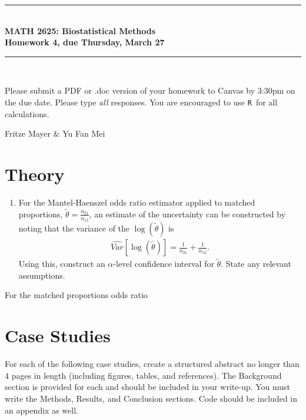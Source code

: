 \documentclass{article}
\newcommand{\HRule}{\rule{\linewidth}{0.5mm}}
\newcommand{\R}{\texttt{R}}
\begin{document}
	\begin{center}
		\HRule \\[0.1cm]
		\vspace{0.1cm}
		{ \LARGE \bfseries MATH 2625: Biostatistical Methods\\[0.5cm] Homework 4, due Thursday, March 27 } \\[0.1cm]
		\HRule \\[0.1cm]
	\end{center}
	
		Please submit a PDF or .doc version of your homework to Canvas by 3:30pm on the due date. Please type \emph{all} responses. You are encouraged to use \R\ for all calculations.

		Fritze Mayer \& Yu Fan Mei
		
	\section*{Theory}
	\begin{enumerate}
		\item For the Mantel-Haenszel odds ratio estimator applied to matched proportions, $\tilde{\theta} = \frac{n_{21}}{n_{12}}$, an estimate of the uncertainty can be constructed by noting that the variance of the $\log(\tilde{\theta})$ is
		\begin{align*}
			\widehat{Var}\left[\log(\tilde{\theta})\right] = \frac{1}{n_{21}} + \frac{1}{n_{12}}.
		\end{align*}
		Using this, construct an $\alpha$-level confidence interval for $\tilde{\theta}$. State any relevant assumptions.
	\end{enumerate}

	For the matched proportions odds ratio 

	\section*{Case Studies}
	For each of the following case studies, create a structured abstract no longer than 4 pages in length (including figures, tables, and references). The Background section is provided for each and should be included in your write-up. You must write the Methods, Results, and Conclusion sections. Code should be included in an appendix as well.
\end{document}
